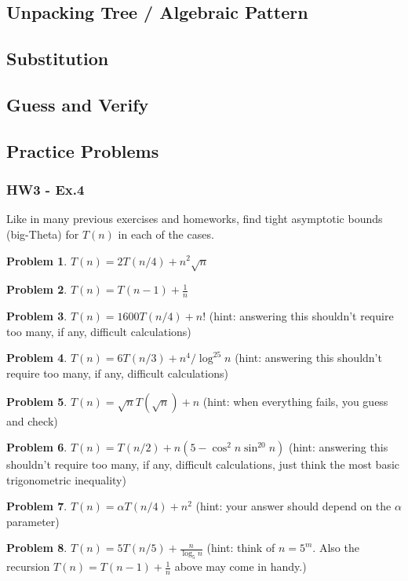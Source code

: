 \documentclass[12pt]{article}
\theoremstyle{definition}
\newtheorem{practiceproblem}{Problem}[section]
\def\scratchwork{\vspace*{10em}} %
\newenvironment{problem}
	{\noindent\begin{minipage}{\textwidth}\begin{practiceproblem}}
	{\scratchwork\end{practiceproblem}\end{minipage}}
\begin{document}
	\subsection{Unpacking Tree / Algebraic Pattern}

	\subsection{Substitution}

	\subsection{Guess and Verify}

	\subsection{Practice Problems}

	\subsubsection{HW3 - Ex.4}

	Like in many previous exercises and homeworks, find tight asymptotic bounds
	(big-Theta) for $T(n)$ in each of the cases.

	\begin{problem}
		$T(n)=2T(n/4)+n^2\sqrt n$
	\end{problem}
	\begin{problem}
		$T(n)=T(n-1)+\frac1n$
	\end{problem}
	\begin{problem}
		$T(n)=1600T(n/4)+n!$ (hint: answering this shouldn't require too many,
		if any, difficult calculations)
	\end{problem}
	\begin{problem}
		$T(n)=6T(n/3)+n^4/\log^{25} n$ (hint: answering this shouldn't require
		too many, if any, difficult calculations)
	\end{problem}
	\begin{problem}
		$T(n)=\sqrt n T(\sqrt{n}) + n$ (hint: when everything fails, you guess
		and check)
	\end{problem}
	\begin{problem}
		$T(n)=T(n/2)+n(5-\cos^2n\sin^{20}n)$ (hint: answering this shouldn't
		require too many, if any, difficult calculations, just think the most
		basic trigonometric inequality)
	\end{problem}
	\begin{problem}
		$T(n)=\alpha T(n/4)+n^2$ (hint: your answer should depend on the
		$\alpha$ parameter)
	\end{problem}
	\begin{problem}
		$T(n)=5T(n/5) +\frac{n}{\log_5 n}$ (hint: think of $n=5^m$. Also the
		recursion $T(n)=T(n-1)+\frac1n$ above may come in handy.)
	\end{problem}
\end{document}
